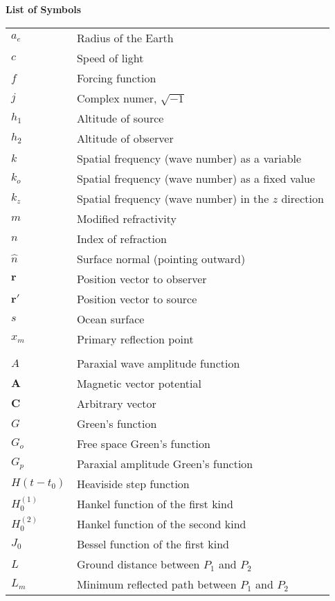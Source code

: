 \noindent\Large{\bf{List of Symbols}}

\vspace{24pt}

\small\normalsize
\begin{supertabular}{ll}
$a_e$ & Radius of the Earth \\
$c$ & Speed of light \\
$f$ & Forcing function \\
$j$ & Complex numer, $\sqrt{-1}$ \\
$h_1$ & Altitude of source\\
$h_2$ & Altitude of observer\\
$k$ & Spatial frequency (wave number) as a variable\\
$k_o$ & Spatial frequency (wave number) as a fixed value \\
$k_z$ & Spatial frequency (wave number) in the $z$ direction \\
$m$ & Modified refractivity \\
$n$ & Index of refraction \\
$\hat{n}$ & Surface normal (pointing outward) \\
$\mathbf{r}$ & Position vector to observer \\
$\mathbf{r}'$ & Position vector to source \\
$s$ & Ocean surface \\
$x_m$ & Primary reflection point \\
\\
$A$ & Paraxial wave amplitude function \\
$\mathbf{A}$ & Magnetic vector potential \\
$\mathbf{C}$ & Arbitrary vector \\
$G$ & Green's function \\
$G_o$ & Free space Green's function \\
$G_p$ & Paraxial amplitude Green’s function \\
$H(t-t_0)$ & Heaviside step function \\
$H_0^{(1)}$ & Hankel function of the first kind \\
$H_0^{(2)}$ & Hankel function of the second kind \\
$J_0$ & Bessel function of the first kind \\
$L$ & Ground distance between $P_1$ and $P_2$\\
$L_m$ & Minimum reflected path between $P_1$ and $P_2$\\

\end{supertabular}
